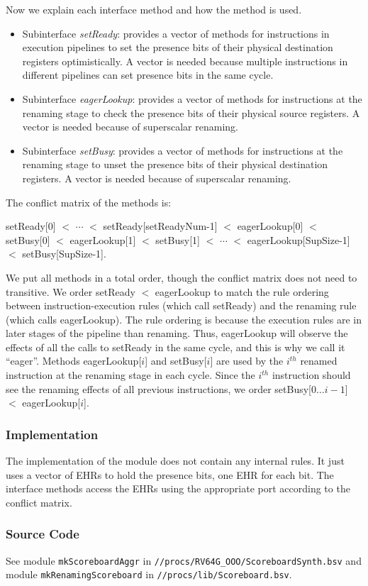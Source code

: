 Now we explain each interface method and how the method is used. 
\begin{itemize}
    \item Subinterface \emph{setReady}: provides a vector of methods for instructions in execution pipelines to set the presence bits of their physical destination registers optimistically.
    A vector is needed because multiple instructions in different pipelines can set presence bits in the same cycle.
    \item Subinterface \emph{eagerLookup}: provides a vector of methods for instructions at the renaming stage to check the presence bits of their physical source registers.
    A vector is needed because of superscalar renaming.
    \item Subinterface \emph{setBusy}: provides a vector of methods for instructions at the renaming stage to unset the presence bits of their physical destination registers.
    A vector is needed because of superscalar renaming.
\end{itemize}

The conflict matrix of the methods is:
\begin{center}
    setReady[0] $<$ $\cdots$ $<$ setReady[setReadyNum-1] $<$ eagerLookup[0] $<$ setBusy[0] $<$ eagerLookup[1] $<$ setBusy[1] $<$ $\cdots$ $<$ eagerLookup[SupSize-1] $<$ setBusy[SupSize-1].
\end{center}
We put all methods in a total order, though the conflict matrix does not need to transitive.
We order setReady $<$ eagerLookup to match the rule ordering between instruction-execution rules (which call setReady) and the renaming rule (which calls eagerLookup).
The rule ordering is because the execution rules are in later stages of the pipeline than renaming.
Thus, eagerLookup will observe the effects of all the calls to setReady in the same cycle, and this is why we call it ``eager''.
Methods eagerLookup[$i$] and setBusy[$i$] are used by the $i^{th}$ renamed instruction at the renaming stage in each cycle.
Since the $i^{th}$ instruction should see the renaming effects of all previous instructions, we order setBusy[$0\ldots i-1$] $<$ eagerLookup[$i$].

\subsubsection{Implementation}
The implementation of the module does not contain any internal rules.
It just uses a vector of EHRs to hold the presence bits, one EHR for each bit.
The interface methods access the EHRs using the appropriate port according to the conflict matrix.

\subsubsection{Source Code}
See module \texttt{mkScoreboardAggr} in \texttt{//procs/RV64G\_OOO/ScoreboardSynth.bsv} and module \texttt{mkRenamingScoreboard} in \texttt{//procs/lib/Scoreboard.bsv}.